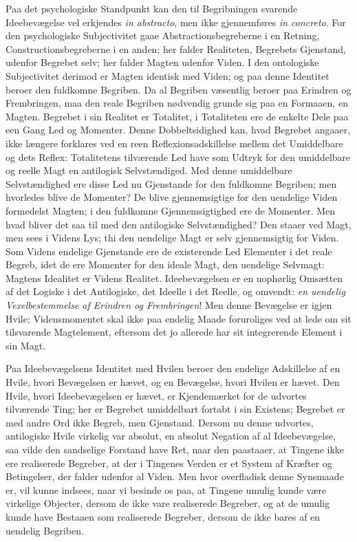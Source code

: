 \documentclass[11pt]{book}
\newcommand{\opage}[1]{\marginnote{\footnotesize\textit{[#1]}}}
\begin{document}
Paa det psychologiske Standpunkt kan den til Begribningen svarende
Ideebevægelse vel erkjendes \textit{in abstracto}, men ikke
gjennemføres \textit{in concreto}. For den psychologiske Subjectivitet
gaae Abstractionsbegreberne i en Retning, Constructionsbegreberne i en
anden; her falder Realiteten, Begrebets Gjenstand, udenfor Begrebet
selv; her falder Magten udenfor Viden. I den ontologiske Subjectivitet
derimod er Magten identisk med Viden; og paa denne Identitet beroer
den fuldkomne Begriben. Da al Begriben væsentlig beroer paa Erindren
og Frembringen, maa den reale Begriben nødvendig grunde sig paa en
Formaaen, en Magten. Begrebet i sin Realitet er Totalitet, i
Totaliteten ere de enkelte Dele paa een Gang Led og Momenter. Denne
Dobbeltsidighed kan, hvad Begrebet angaaer, ikke længere forklares ved
en reen Reflexionsadskillelse mellem det Umiddelbare og dets Reflex:
Totalitetens tilværende Led have som Udtryk for den umiddelbare og
reelle Magt en antilogisk Selvstændiged. %
Med denne umiddelbare Selvstændighed ere disse Led nu Gjenstande for
den fuldkomne Begriben; men hvorledes blive de Momenter? De blive
gjennemsigtige for den uendelige Viden formedelst Magten; i den
fuldkomne Gjennemsigtighed ere de Momenter. Men hvad bliver det saa
til med den antilogiske Selvstændighed? Den staaer ved Magt, men sees
i Videns Lys; thi den uendelige Magt er selv gjennemsigtig for Viden.
Som
\opage{171} \setcounter{footnote}{0}%
Videns endelige Gjenstande ere de existerende Led Elementer i det
reale Begreb, idet de ere Momenter for den ideale Magt, den uendelige
Selvmagt: Magtens Idealitet er Videns Realitet. Ideebevægelsen er en
uophørlig Omsætten af det Logiske i det Antilogiske, det Ideelle i det
Reelle, og omvendt: \emph{en uendelig Vexelbestemmelse af Erindren og
Frembringen}! Men denne Bevægelse er igjen Hvile; Vidensmomentet skal
ikke paa endelig Maade foruroliges ved at lede om sit tilsvarende
Magtelement, eftersom det jo allerede har sit integrerende Element i
sin Magt.

Paa Ideebevægelsens Identitet med Hvilen beroer den endelige
Adskillelse af en Hvile, hvori Bevægelsen er hævet, og en Bevægelse,
hvori Hvilen er hævet. Den Hvile, hvori Ideebevægelsen er hævet, er
Kjendemærket for de udvortes tilværende Ting; her er Begrebet
umiddelbart fortabt i sin Existens; Begrebet er med andre Ord ikke
Begreb, men Gjenstand. Dersom nu denne udvortes, antilogiske Hvile
virkelig var absolut, en absolut Negation af al Ideebevægelse, saa
vilde den sandselige Forstand have Ret, naar den paastaaer, at
Tingene ikke ere realiserede Begreber, at der i Tingenes Verden er et
System af Kræfter og Betingelser, der falder udenfor al Viden. Men
hvor overfladisk denne Synsmaade er, vil kunne indsees, naar vi
besinde os paa, at Tingene umulig kunde være virkelige Objecter,
dersom de ikke vare realiserede Begreber, og at de umulig kunde have
Bestaaen som realiserede Begreber, dersom de ikke bares af en uendelig
Begriben.
\end{document}
